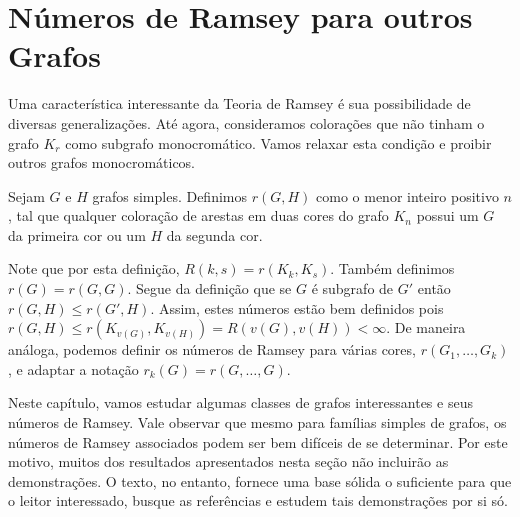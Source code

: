 
\chapter{Números de Ramsey para outros Grafos}
\label{chap:graph}


Uma característica interessante da Teoria de Ramsey é sua possibilidade de diversas generalizações. Até agora, consideramos colorações que não tinham o grafo $K_r$ como subgrafo monocromático. Vamos relaxar esta condição e proibir outros grafos monocromáticos.

\begin{definition}
Sejam $G$ e $H$ grafos simples. Definimos $r(G,H)$ como o menor inteiro positivo $n$, tal que qualquer coloração de arestas em duas cores do grafo $K_n$ possui um $G$ da primeira cor ou um $H$ da segunda cor.
\end{definition}

Note que por esta definição, $R(k,s) = r(K_k, K_s)$. Também definimos $r(G) = r(G,G)$. Segue da definição que se $G$ é subgrafo de $G'$ então $r(G,H) \leq r(G',H)$. Assim, estes números estão bem definidos pois $r(G,H) \leq r(K_{v(G)}, K_{v(H)}) = R(v(G), v(H)) < \infty$. De maneira análoga, podemos definir os números de Ramsey para várias cores, $r(G_1, \dots, G_k)$, e adaptar a notação $r_k(G) = r(G,\dots,G)$.

Neste capítulo, vamos estudar algumas classes de grafos interessantes e seus números de Ramsey. Vale observar que mesmo para famílias simples de grafos, os números de Ramsey associados podem ser bem difíceis de se determinar. Por este motivo, muitos dos resultados apresentados nesta seção não incluirão as demonstrações. O texto, no entanto, fornece uma base sólida o suficiente para que o leitor interessado, busque as referências e estudem tais demonstrações por si só.


